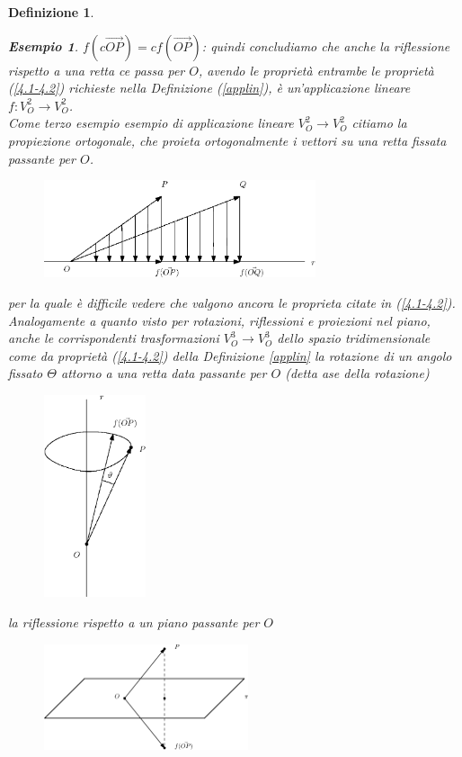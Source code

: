 \message{ !name(algebraegeometria.tex)}\documentclass{book}
\newtheorem{definizione}{Definizione}
\newtheorem{esempio}{Esempio}
\begin{document}
\begin{definizione}
\begin{esempio}
    $f(c\vec{OP})=cf(\vec{OP})$: quindi concludiamo che anche la riflessione rispetto a una retta ce passa per
    $O$, avendo le proprietà entrambe le proprietà (\ref{4.1-4.2}) richieste nella Definizione (\ref{applin}),
    è un'applicazione lineare $f:V_O^2\to        V_O^2$.\\
    Come terzo esempio esempio di applicazione lineare $V_O^2\to V_O^2$ citiamo la propiezione ortogonale,
    che proieta ortogonalmente i vettori su una retta fissata passante per $O$.
    \begin{figure}[th]
      \centering
        \includegraphics[width=8cm]{img/finiti/imgex4-2-7.eps}
    \end{figure}
      
    per la quale è difficile vedere che valgono ancora le proprieta citate in (\ref{4.1-4.2}).\\
    Analogamente a quanto visto per rotazioni, riflessioni e proiezioni nel piano, anche le corrispondenti
    trasformazioni $V_O^3\to V_O^3$ dello spazio tridimensionale come da proprietà (\ref{4.1-4.2}) della
    Definizione \ref{applin} la rotazione di un angolo fissato $\Theta$ attorno a una retta data passante per $O$
    (detta ase della rotazione)
    \clearpage
    \begin{figure}[th]
      \centering
        \includegraphics[width=3cm]{img/finiti/imgex4-2-8.eps}
    \end{figure}
    la riflessione rispetto a un piano passante per $O$
    \begin{figure}[th]
      \centering
        \includegraphics[width=6cm]{img/finiti/imgex4-2-9.eps}
    \end{figure}
      

\end{esempio}
\end{definizione}
\end{document}
